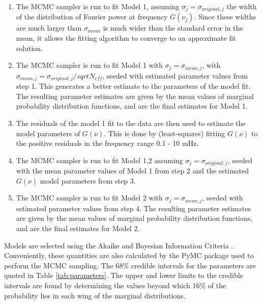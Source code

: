 \documentclass[onecolumn]{emulateapj}
\begin{document}
\begin{enumerate}
\item The MCMC sampler is run to fit Model 1, assuming $\sigma_{j} =
  \sigma_{original, j}$ the width of the distribution of Fourier power
  at frequency $G(\nu_{j})$.  Since these widths are much larger than
  $\sigma_{mean}$ is much wider than the standard error in the mean,
  it allows the fitting algorithm to converge to an approximate fit
  solution.
\item The MCMC sampler is run to fit Model 1 with $\sigma_{j} =
  \sigma_{mean, j}$, with $\sigma_{mean, j}= \sigma_{original,
    j}/sqrt{N_{eff}}$, seeded with estimated parameter values from
  step 1.  This generates a better estimate to the parameters of the
  model fit.  The resulting parameter estimates are given by the mean
  values of marginal probability distribution functions, and are the
  final estimates for Model 1.
\item The residuals of the model 1 fit to the data are then used to
  estimate the model parameters of $G(\nu)$.  This is done by
  (least-squares) fitting $G(\nu)$ to the positive residuals in the
  frequency range 0.1 - 10 mHz.
\item The MCMC sampler is run to fit Model 1,2 assuming $\sigma_{j} =
  \sigma_{original, j}$, seeded with the mean parameter values of
  Model 1 from step 2 and the estimated $G(\nu)$ model parameters from
  step 3.
\item The MCMC sampler is run to fit Model 2 with $\sigma_{j} =
  \sigma_{mean, j}$, seeded with estimated parameter values from step
  4.  The resulting parameter estimates are given by the mean values
  of marginal probability distribution functions, and are the final
  estimates for Model 2.
\end{enumerate}
Models are selected using the Akaike and Bayesian Information Criteria
\citep{2007MNRAS.377L..74L}.  Conveniently, these quantities are also
calculated by the PyMC package used to perform the MCMC sampling.  The
68\% credible intervals for the parameters are quoted in Table
\ref{tab:parameters}.  The upper and lower limits to the credible
intervals are found by determining the values beyond which 16\% of the
probability lies in each wing of the marginal distributions.

\end{document}
